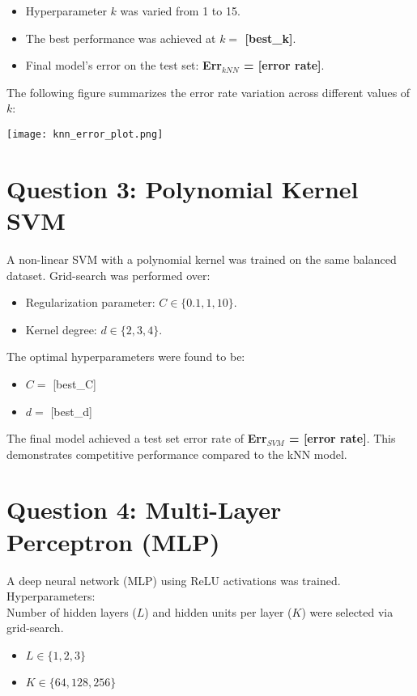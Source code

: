 \documentclass[12pt]{article}
\begin{document}
\begin{itemize}
    \item Hyperparameter $k$ was varied from 1 to 15.
    \item The best performance was achieved at \textbf{$k = $ [best\_k]}.
    \item Final model's error on the test set: \textbf{Err$_{kNN}$ = [error rate]}.
\end{itemize}

The following figure summarizes the error rate variation across different values of $k$:

\begin{center}
\texttt{[image: knn\_error\_plot.png]}
\end{center}

\section*{Question 3: Polynomial Kernel SVM}
A non-linear SVM with a polynomial kernel was trained on the same balanced dataset. Grid-search was performed over:

\begin{itemize}
    \item Regularization parameter: $C \in \{0.1, 1, 10\}$.
    \item Kernel degree: $d \in \{2, 3, 4\}$.
\end{itemize}

The optimal hyperparameters were found to be:
\begin{itemize}
    \item $C = $ [best\_C]
    \item $d = $ [best\_d]
\end{itemize}

The final model achieved a test set error rate of \textbf{Err$_{SVM}$ = [error rate]}. This demonstrates competitive performance compared to the kNN model.

\section*{Question 4: Multi-Layer Perceptron (MLP)}
A deep neural network (MLP) using ReLU activations was trained. Hyperparameters:\\
Number of hidden layers ($L$) and hidden units per layer ($K$) were selected via grid-search.

\begin{itemize}
    \item $L \in \{1, 2, 3\}$
    \item $K \in \{64, 128, 256\}$
\end{itemize}
\end{document}
